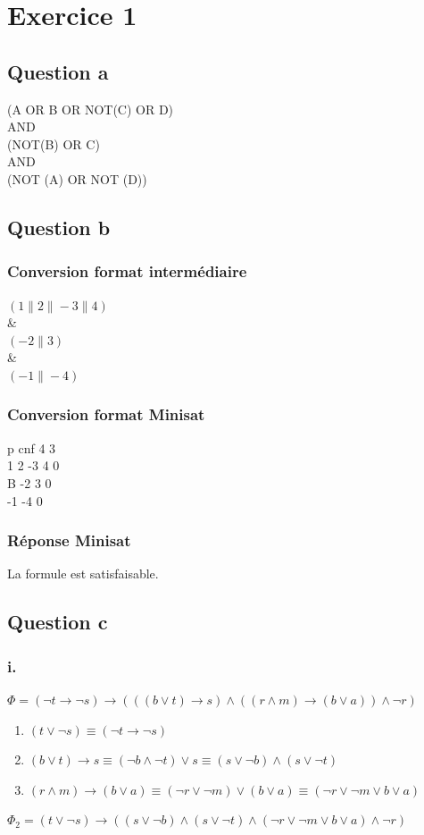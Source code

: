 \documentclass[12pt]{report}
\begin{document}
\section*{Exercice 1}
\subsection*{Question a}
(A OR B OR NOT(C) OR D) \\
AND\\
(NOT(B) OR C)\\
AND\\
(NOT (A) OR NOT (D))

\subsection*{Question b}
\subsubsection*{Conversion format intermédiaire}
$( 1\| 2 \| -3 \| 4 )$\\
\& \\
$( -2 \| 3 )$\\
\& \\
$( -1 \| -4 )$
\subsubsection*{Conversion format Minisat}
p cnf 4 3\\
1 2 -3 4 0\\B
-2 3 0\\
-1 -4 0
\subsubsection*{Réponse Minisat}
La formule est satisfaisable.

\subsection*{Question c}
\subsubsection*{i.}
$\Phi = (\lnot t \rightarrow \lnot s) \rightarrow (((b \lor t) \rightarrow s) \land ((r \land m) \rightarrow (b \lor a))\land \lnot r)$ 
\begin{enumerate}
	\item $(t \lor \lnot s) \equiv (\lnot t \rightarrow \lnot s)$
	\item $(b \lor t) \rightarrow s \equiv (\lnot b \land \lnot t) \lor s \equiv (s\lor \lnot b) \land (s \lor \lnot t)$
	\item $(r \land m) \rightarrow (b \lor a) \equiv (\lnot r \lor \lnot m) \lor (b \lor a) \equiv (\lnot r \lor \lnot m \lor b \lor a)$
\end{enumerate}
$\Phi_2 = (t \lor \lnot s) \rightarrow ((s \lor \lnot b) \land (s \lor \lnot t) \land (\lnot r \lor \lnot m \lor b \lor a) \land \lnot r)$
\end{document}
